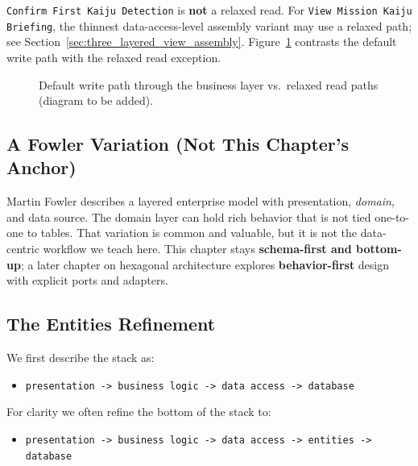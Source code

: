 \texttt{Confirm First Kaiju Detection} is \textbf{not} a relaxed read. For \texttt{View Mission Kaiju Briefing}, the thinnest data-access-level assembly variant may use a relaxed path; see Section~\ref{sec:three_layered_view_assembly}. Figure~\ref{fig:three_layered_relaxed_reads} contrasts the default write path with the relaxed read exception.

\begin{figure}[htbp]
\centering
{}
\caption{Default write path through the business layer vs.\ relaxed read paths (diagram to be added).}
\label{fig:three_layered_relaxed_reads}
\end{figure}

\subsection{A Fowler Variation (Not This Chapter's Anchor)}
\label{sec:three_layered_fowler_variation}

Martin Fowler describes a layered enterprise model with presentation, \textit{domain}, and data source.\autocite{fowler2002patterns} The domain layer can hold rich behavior that is not tied one-to-one to tables. That variation is common and valuable, but it is not the data-centric workflow we teach here. This chapter stays \textbf{schema-first and bottom-up}; a later chapter on hexagonal architecture explores \textbf{behavior-first} design with explicit ports and adapters.

\subsection{The Entities Refinement}
\label{sec:three_layered_entities_refinement}

We first describe the stack as:
\begin{itemize}
    \item \texttt{presentation -> business logic -> data access -> database}
\end{itemize}

For clarity we often refine the bottom of the stack to:
\begin{itemize}
    \item \texttt{presentation -> business logic -> data access -> entities -> database}
\end{itemize}

